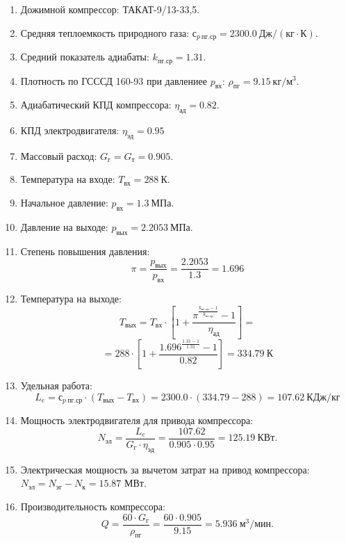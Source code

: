 \documentclass[a4paper,12pt]{article}
\begin{document}
%    
\begin{enumerate}
    \item Дожимной компрессор: ТАКАТ-9/13-33,5.
    \item Средняя теплоемкость природного газа: $с_{p\ пг.ср} = 2300.0\ Дж/(кг \cdot К) $.
    \item Средний показатель адиабаты: $k_{пг.ср} = 1.31$.
    \item Плотность по ГСССД 160-93 при давлениее $p_{вх}$: $\rho_{пг} = 9.15\ кг/м^3$.
    \item Адиабатический КПД компрессора: $\eta_{ад} = 0.82$.
    \item КПД электродвигателя: $\eta_{эд} = 0.95$
    \item Массовый расход: $G_{г} = G_{т} = 0.905$.
    \item Температура на входе: $T_{вх} = 288\ К$.
    \item Начальное давление: $p_{вх} = 1.3\ МПа$.
    \item Давление на выходе: $p_{вых} = 2.2053\ МПа$.
    \item Степень повышения давления:
    \[
        \pi = \frac{p_{вых}}{p_{вх}} = \frac{2.2053}
        {1.3} =
        1.696
    \]
    \item Температура на выходе:
    \[
        T_{вых} = T_{вх} \cdot \left[
                1 + \frac{
                        \pi^{\frac{k_{пг.ср} - 1}{k_{пг.ср}}} - 1
                    }{ \eta_{ад} }
        \right] =
    \]
    \[
        = 288 \cdot \left[
                1 + \frac{
                        1.696 ^
                        {\frac{1.31 - 1}{1.31}} - 1
                    }{ 0.82 }
        \right] =
        334.79\ К
    \]
    \item Удельная работа:
    \[
        L_e = с_{p\ пг.ср} \cdot ( T_{вых} - T_{вх} ) =
                2300.0 \cdot ( 334.79 - 288 ) =
        107.62\ КДж/кг
    \]
    \item Мощность электродвигателя для привода компрессора:
    \[
        N_{эл} = \frac{L_e}{G_{г} \cdot \eta_{эд}} =
        \frac{107.62}
        {0.905 \cdot 0.95 } =
        125.19\ КВт.
    \]
    \item Электрическая мощность за вычетом затрат на привод компрессора: $N_{эл} = N_{эг} - N_{к} = 15.87$ МВт.
    \item Производительность компрессора:
    \[
        Q = \frac{60 \cdot G_г}{\rho_{пг}} = \frac{60 \cdot 0.905}
        {9.15} = 5.936\ м^{3}/мин.
    \]
\end{enumerate}
\end{document}
